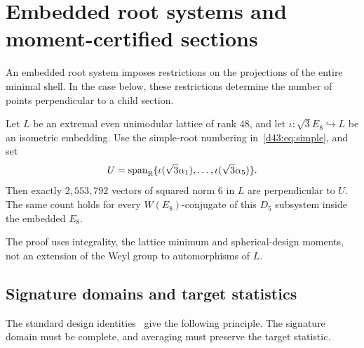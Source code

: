 \section{Embedded root systems and moment-certified sections}\label{sec:sections}
An embedded root system imposes restrictions on the projections of the
entire minimal shell. In the case below, these restrictions determine
the number of points perpendicular to a child section.

\begin{theorem}\label{d43:thm:structure}
Let $L$ be an extremal even unimodular lattice of rank 48, and let
$\iota:\sqrt3E_8\hookrightarrow L$ be an isometric embedding.
Use the simple-root numbering in~\eqref{d43:eq:simple}, and set
\[
 U=\operatorname{span}_{\mathbb R}\{\iota(\sqrt3\alpha_1),\ldots,
                              \iota(\sqrt3\alpha_5)\}.
\]
Then exactly $2,553,792$ vectors of squared norm 6 in $L$ are
perpendicular to $U$. The same count holds for every $W(E_8)$-conjugate
of this $D_5$ subsystem inside the embedded $E_8$.
\end{theorem}

The proof uses integrality, the lattice minimum and spherical-design
moments, not an extension of the Weyl group to automorphisms of $L$.

\subsection{Signature domains and target statistics}
The standard design identities~\cite{dgs,nebe-designs} give the following
principle. The signature domain must be complete, and averaging must
preserve the target statistic.

